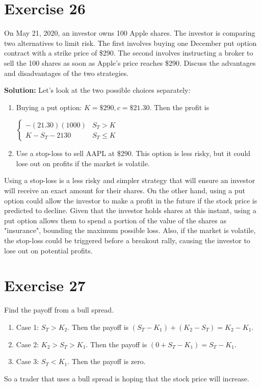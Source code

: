 \documentclass{article}
\begin{document}
\section*{Exercise 26}
On May 21, 2020, an investor owns 100 Apple shares. The investor is comparing two alternatives to limit risk. The first involves buying one December put option contract
with a strike price of \$290. The second involves instructing a broker to sell the 100 shares as soon as Apple’s
price reaches \$290. Discuss the advantages and disadvantages of the two strategies.

\textbf{Solution:} Let's look at the two possible choices separately:
\begin{enumerate}
    \item Buying a put option: $K = \$290, c = \$21.30$. Then the profit is
    \begin{center}
        $\begin{cases}
        -(21.30)(1000) & S_T > K \\
        K - S_T - 2130 & S_T \leq K
        \end{cases}$
    \end{center}
    \item Use a stop-loss to sell AAPL at \$290. This option is less risky, but it could lose out on profits if the market is volatile.
\end{enumerate}
Using a stop-loss is a less risky and simpler strategy that will ensure an investor will receive an exact amount for their shares. On the other hand,
using a put option could allow the investor to make a profit in the future if the stock price is predicted to decline. Given that the investor holds shares
at this instant, using a put option allows them to spend a portion of the value of the shares as "insurance", bounding the maximum possible loss. Also, if the market
is volatile, the stop-loss could be triggered before a breakout rally, causing the investor to lose out on potential profits.


\section*{Exercise 27}
Find the payoff from a bull spread.
\begin{enumerate}
    \item Case 1: $S_T > K_2$. Then the payoff is $(S_T - K_1) + (K_2 - S_T) = K_2 - K_1$.
    \item Case 2: $K_2 > S_T > K_1$. Then the payoff is $(0 + S_T - K_1) = S_T - K_1$.
    \item Case 3: $S_T < K_1$. Then the payoff is zero.
\end{enumerate}
So a trader that uses a bull spread is hoping that the stock price will increase.
\end{document}
